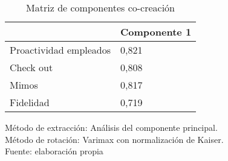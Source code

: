 \begin{table}[h]
    \caption {Matriz de componentes co-creación}
	\label{tab:componentes2}
	\setlength\extrarowheight{5pt}
	
	\begin{tabular}{p{8.0cm} p{4.3cm}}
	\toprule
		& Componente 1 \\
	\midrule
	Proactividad empleados & 0,821 \\
	Check out & 0,808 \\
	Mimos & 0,817 \\
	Fidelidad & 0,719 \\
	\bottomrule
	\end{tabular}
	
	\center
	\footnotesize
	Método de extracción: Análisis del componente principal.\\
	Método de rotación: Varimax con normalización de Kaiser.\\
	Fuente: elaboración propia
\end{table}
